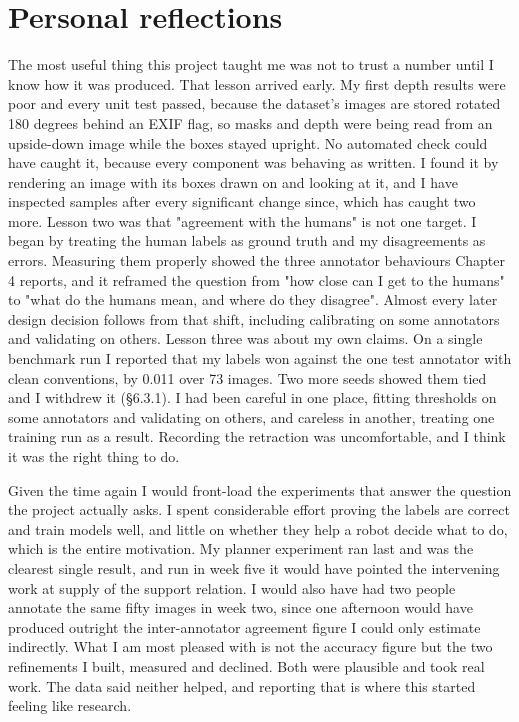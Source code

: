 \section{Personal reflections}

The most useful thing this project taught me was not to trust a number until I know how it was produced. That lesson arrived early. My first depth results were poor and every unit test passed, because the dataset's images are stored rotated 180 degrees behind an EXIF flag, so masks and depth were being read from an upside-down image while the boxes stayed upright. No automated check could have caught it, because every component was behaving as written. I found it by rendering an image with its boxes drawn on and looking at it, and I have inspected samples after every significant change since, which has caught two more. Lesson two was that "agreement with the humans" is not one target. I began by treating the human labels as ground truth and my disagreements as errors. Measuring them properly showed the three annotator behaviours Chapter 4 reports, and it reframed the question from "how close can I get to the humans" to "what do the humans mean, and where do they disagree". Almost every later design decision follows from that shift, including calibrating on some annotators and validating on others. Lesson three was about my own claims. On a single benchmark run I reported that my labels won against the one test annotator with clean conventions, by 0.011 over 73 images. Two more seeds showed them tied and I withdrew it (\S{}6.3.1). I had been careful in one place, fitting thresholds on some annotators and validating on others, and careless in another, treating one training run as a result. Recording the retraction was uncomfortable, and I think it was the right thing to do.

Given the time again I would front-load the experiments that answer the question the project actually asks. I spent considerable effort proving the labels are correct and train models well, and little on whether they help a robot decide what to do, which is the entire motivation. My planner experiment ran last and was the clearest single result, and run in week five it would have pointed the intervening work at supply of the support relation. I would also have had two people annotate the same fifty images in week two, since one afternoon would have produced outright the inter-annotator agreement figure I could only estimate indirectly. What I am most pleased with is not the accuracy figure but the two refinements I built, measured and declined. Both were plausible and took real work. The data said neither helped, and reporting that is where this started feeling like research.